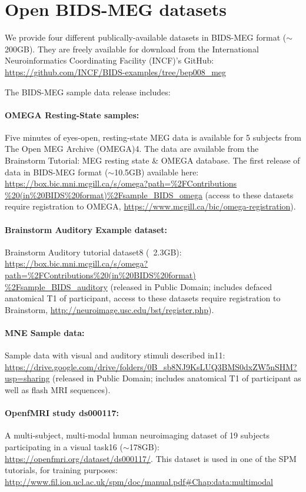 \section{Open BIDS-MEG datasets}
We provide four different publically-available datasets in BIDS-MEG format ($\sim$200GB). They are freely available for download from the International Neuroinformatics Coordinating Facility (INCF)’s  GitHub: \url{https://github.com/INCF/BIDS-examples/tree/bep008_meg}

The BIDS-MEG sample data release includes: 

\paragraph{OMEGA Resting-State samples:} Five minutes of eyes-open, resting-state MEG data is available for 5 subjects from The Open MEG Archive (OMEGA)4. The data are available from the Brainstorm Tutorial: MEG resting state \& OMEGA database. The first release of data in BIDS-MEG format ($\sim$10.5GB) available here: 
\url{https://box.bic.mni.mcgill.ca/s/omega?path=\%2FContributions
\%20(in\%20BIDS\%20format)\%2Fsample_BIDS_omega} (access to these datasets require registration to OMEGA, \url{https://www.mcgill.ca/bic/omega-registration}).

\paragraph{Brainstorm Auditory Example dataset:} Brainstorm Auditory tutorial dataset8 (~2.3GB):
\url{https://box.bic.mni.mcgill.ca/s/omega?
path=\%2FContributions\%20(in\%20BIDS\%20format)
\%2Fsample_BIDS_auditory} (released in Public Domain; includes defaced anatomical T1 of participant, access to these datasets require registration to Brainstorm, \url{http://neuroimage.usc.edu/bst/register.php}). 

\paragraph{MNE Sample data:} Sample data with visual and auditory stimuli described in11:
\url{https://drive.google.com/drive/folders/0B_sb8NJ9KsLUQ3BMS0dxZW5nSHM?usp=sharing} (released in Public Domain; includes anatomical T1 of participant as well as flash MRI sequences). 

\paragraph{OpenfMRI study ds000117:} A multi-subject, multi-modal human neuroimaging dataset of 19 subjects participating in a visual task16 ($\sim$178GB): \url{https://openfmri.org/dataset/ds000117/}. This dataset is used in one of the SPM tutorials, for training purposes:
\url{http://www.fil.ion.ucl.ac.uk/spm/doc/manual.pdf#Chap:data:multimodal}

